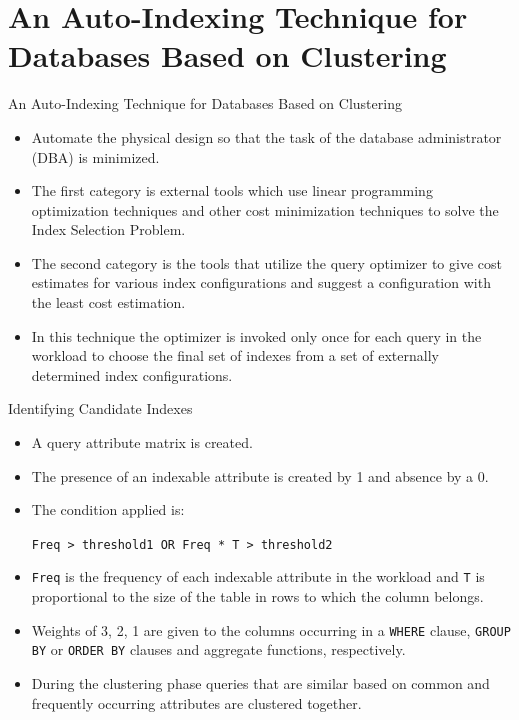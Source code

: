 \documentclass[Serif, 10pt, brown]{beamer}
\theoremstyle{example}
\theoremstyle{plain}
\begin{document}
\section{An Auto-Indexing Technique for Databases Based on Clustering}

\begin{frame}{An Auto-Indexing Technique for Databases Based on Clustering}
	\begin{itemize}
		\item Automate the physical design so that the task of the database administrator (DBA) is minimized.
		\item The first category is external tools which use linear programming optimization techniques and other cost minimization techniques to solve the Index Selection Problem.
		\item The second category is the tools that utilize the query optimizer to give cost estimates for various index
		configurations and suggest a configuration with the least cost estimation.
		\item In this technique the optimizer is invoked only once for each query in the workload to choose the final set of indexes from a set of externally determined index configurations.
	\end{itemize}
\end{frame}

\begin{frame}{Identifying Candidate Indexes}
	\begin{itemize}
		\item A query attribute matrix is created.
		\item The presence of an indexable attribute is created by 1 and absence by a 0.
		\item The condition applied is:
		
		\texttt{Freq > threshold1 OR Freq * T > threshold2}
		\item \texttt{Freq} is the frequency of each indexable attribute in the workload and \texttt{T} is proportional to the size of the table in rows to which the column belongs.
		\item Weights of 3, 2, 1 are given to the columns occurring in a {\tt WHERE} clause, {\tt GROUP BY} or {\tt ORDER BY} clauses and aggregate functions, respectively.
		\item During the clustering phase queries that are similar based on common and frequently occurring attributes are clustered together.
	\end{itemize}
\end{frame}
\end{document}
